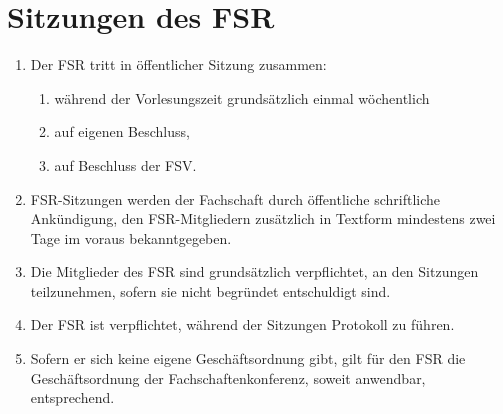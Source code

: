 \documentclass{article}
\begin{document}
\section{Sitzungen des FSR}
\begin{enumerate}[(1)]
    \item Der FSR tritt in öffentlicher Sitzung zusammen:
    \begin{enumerate}[1.]
        \item während der Vorlesungszeit grundsätzlich einmal wöchentlich
        \item auf eigenen Beschluss,
        \item auf Beschluss der FSV.
    \end{enumerate}
    \item FSR-Sitzungen werden der Fachschaft durch öffentliche schriftliche Ankündigung, den FSR-Mitgliedern zusätzlich in Textform mindestens zwei Tage im voraus bekanntgegeben.
    \item Die Mitglieder des FSR sind grundsätzlich verpflichtet, an den Sitzungen teilzunehmen, sofern sie nicht begründet entschuldigt sind.
    \item Der FSR ist verpflichtet, während der Sitzungen Protokoll zu führen.
    \item Sofern er sich keine eigene Geschäftsordnung gibt, gilt für den FSR die Geschäftsordnung der Fachschaftenkonferenz, soweit anwendbar, entsprechend.
\end{enumerate}
\end{document}
